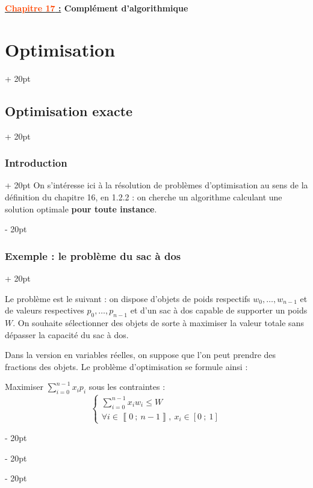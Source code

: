 \documentclass[a4paper, 12pt, twoside]{article}
\newcommand{\Emph}{\textcolor{ff4500}}
\newcommand{\seg}[2]{\left[ #1\ ;\ #2 \right]}
\newcommand{\nset}[2]{\left\llbracket #1\ ;\ #2 \right\rrbracket}
\renewcommand{\le}{\leqslant}
\newcommand{\ind}[1][20pt]{\advance\leftskip + #1}
\newcommand{\deind}[1][20pt]{\advance\leftskip - #1}
\newenvironment{indt}[2][20pt]{#2 \par \ind[#1]}{\par \deind} %
\newcommand{\thetitle}[2]{\begin{center}\textbf{{\LARGE \underline{\Emph{#1} :}} {\Large #2}}\end{center}}
\newcommand{\1}{\mathbbm 1}
\begin{document}
    
    \thetitle{Chapitre 17}{Complément d'algorithmique}
    
    \tableofcontents
    \listofalgorithms
    \newpage
    
    \begin{indt}{\section{Optimisation}}
        \begin{indt}{\subsection{Optimisation exacte}}
            \begin{indt}{\subsubsection{Introduction}}
                On s'intéresse ici à la résolution de problèmes d'optimisation au sens de la définition du chapitre 16, en 1.2.2 : on cherche un algorithme calculant une solution optimale \textbf{pour toute instance}.
            \end{indt}

            \vspace{12pt}
            
            \begin{indt}{\subsubsection{Exemple : le problème du sac à dos}}
                \label{1.1.2}

                Le problème est le suivant : on dispose d'objets de poids respectifs $w_0, \ldots, w_{n - 1}$ et de valeurs respectives $p_0, \ldots, p_{n - 1}$ et d'un sac à dos capable de supporter un poids $W$. On souhaite sélectionner des objets de sorte à maximiser la valeur totale sans dépasser la capacité du sac à dos.

                Dans la version en variables réelles, on suppose que l'on peut prendre des fractions des objets. Le problème d'optimisation se formule ainsi :

                Maximiser $\displaystyle \sum_{i = 0}^{n - 1} x_i p_i$ sous les contraintes :
                \[
                    \begin{cases}
                        \displaystyle
                        \sum_{i = 0}^{n - 1} x_i w_i \le W
                        \\
                        \forall i \in \nset 0 {n - 1},\ x_i \in \seg 0 1
                    \end{cases}
                \]


\end{indt}
\end{indt}
\end{indt}
\end{document}
